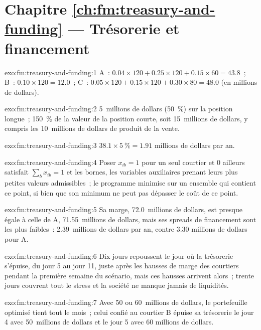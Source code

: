\section*{Chapitre \ref{ch:fm:treasury-and-funding} --- Trésorerie et financement}

\begin{solution}{exo:fm:treasury-and-funding:1}
A~: $0.04\times120+0.25\times120+0.15\times60=43.8$~; B~: $0.10\times120=12.0$~; C~: $0.05\times120+0.15\times120+0.30\times80=48.0$ (en millions de dollars).
\end{solution}

\begin{solution}{exo:fm:treasury-and-funding:2}
5~millions de dollars (50~\%) sur la position longue~; 150~\% de la valeur de la position courte, soit 15~millions de dollars, y compris les 10~millions de dollars de produit de la vente.
\end{solution}

\begin{solution}{exo:fm:treasury-and-funding:3}
$38.1\times5~\%=1.91$ millions de dollars par an.
\end{solution}

\begin{solution}{exo:fm:treasury-and-funding:4}
Poser $x_{ib}=1$ pour un seul courtier et 0 ailleurs satisfait $\sum_bx_{ib}=1$ et les bornes, les variables auxiliaires prenant
leurs plus petites valeurs admissibles~; le programme minimise sur un ensemble qui contient ce point, si bien que son minimum ne peut pas dépasser le coût de ce point.
\end{solution}

\begin{solution}{exo:fm:treasury-and-funding:5}
Sa marge, 72.0~millions de dollars, est presque égale à celle de A, 71.55~millions de dollars, mais ses spreads de financement sont les plus faibles~: 2.39~millions de dollars par an, contre 3.30
millions de dollars pour A.
\end{solution}

\begin{solution}{exo:fm:treasury-and-funding:6}
Dix jours repoussent le jour où la trésorerie s'épuise, du jour 5 au jour 11, juste après les hausses de marge des courtiers pendant la première semaine du scénario, mais ces hausses
arrivent alors~; trente jours couvrent tout le stress et la société ne manque jamais de liquidités.
\end{solution}

\begin{solution}{exo:fm:treasury-and-funding:7}
Avec 50 ou 60~millions de dollars, le portefeuille optimisé tient tout le mois~; celui confié au courtier B épuise sa trésorerie le jour 4 avec 50~millions de dollars et le jour 5 avec 60
millions de dollars.
\end{solution}

